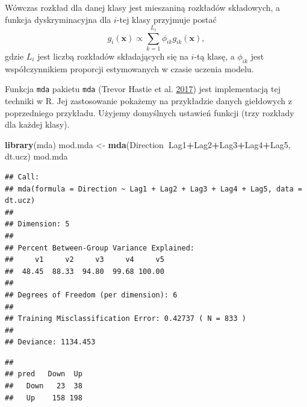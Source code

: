 \documentclass[]{book}
\newenvironment{Shaded}{\begin{snugshade}}{\end{snugshade}}
\newcommand{\DataTypeTok}[1]{\textcolor[rgb]{0.13,0.29,0.53}{#1}}
\newcommand{\KeywordTok}[1]{\textcolor[rgb]{0.13,0.29,0.53}{\textbf{#1}}}
\newcommand{\NormalTok}[1]{#1}
\newcommand{\OperatorTok}[1]{\textcolor[rgb]{0.81,0.36,0.00}{\textbf{#1}}}
\newcommand{\StringTok}[1]{\textcolor[rgb]{0.31,0.60,0.02}{#1}}
\theoremstyle{plain}
\theoremstyle{definition}
\theoremstyle{definition}
\theoremstyle{definition}
\theoremstyle{definition}
\theoremstyle{remark}
\let\BeginKnitrBlock\begin \let\EndKnitrBlock\end
\begin{document}
Wówczas rozkład dla danej klasy jest mieszaniną rozkładów składowych, a funkcja dyskryminacyjna dla \(i\)-tej klasy przyjmuje postać
\begin{equation}
    g_i(\boldsymbol x)\propto \sum_{k=1}^{L_i}\phi_{ik}g_{ik}(\boldsymbol x),
\end{equation}
gdzie \(L_i\) jest liczbą rozkładów składających się na \(i\)-tą klasę, a \(\phi_{ik}\) jest współczynnikiem proporcji estymowanych w czasie uczenia modelu.

\BeginKnitrBlock{example}
\protect\hypertarget{exm:mda}{}{\label{exm:mda} }Funkcja \texttt{mda} pakietu \texttt{mda} (Trevor Hastie et al. \protect\hyperlink{ref-R-mda}{2017}) jest implementacją tej techniki w R. Jej zastosowanie pokażemy na przykładzie danych giełdowych z poprzedniego przykładu. Użyjemy domyślnych ustawień funkcji (trzy rozkłady dla każdej klasy).
\EndKnitrBlock{example}

\begin{Shaded}
\begin{Highlighting}[]
\KeywordTok{library}\NormalTok{(mda)}
\NormalTok{mod.mda <-}\StringTok{ }\KeywordTok{mda}\NormalTok{(Direction}\OperatorTok{~}\NormalTok{Lag1}\OperatorTok{+}\NormalTok{Lag2}\OperatorTok{+}\NormalTok{Lag3}\OperatorTok{+}\NormalTok{Lag4}\OperatorTok{+}\NormalTok{Lag5, dt.ucz)}
\NormalTok{mod.mda}
\end{Highlighting}
\end{Shaded}

\begin{verbatim}
## Call:
## mda(formula = Direction ~ Lag1 + Lag2 + Lag3 + Lag4 + Lag5, data = dt.ucz)
## 
## Dimension: 5 
## 
## Percent Between-Group Variance Explained:
##     v1     v2     v3     v4     v5 
##  48.45  88.33  94.80  99.68 100.00 
## 
## Degrees of Freedom (per dimension): 6 
## 
## Training Misclassification Error: 0.42737 ( N = 833 )
## 
## Deviance: 1134.453
\end{verbatim}

\begin{Shaded}
\end{Shaded}

\begin{verbatim}
##       
## pred   Down  Up
##   Down   23  38
##   Up    158 198
\end{verbatim}
\end{document}
